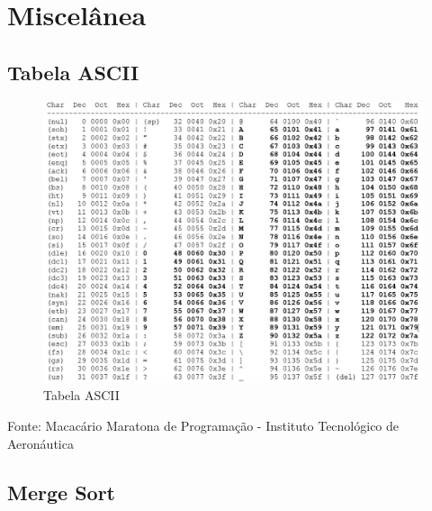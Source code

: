 \newpage
\section{Miscelânea}
\subsection{Tabela ASCII}

\begin{figure}[H]
    \caption{Tabela ASCII} 
    \vspace{0.5cm}
    \vspace{\belowcaptionskip}
    \centering
    \includegraphics[scale = 0.5]{image/ascii.jpg}
    \par\medskip
    \label{fig:ascii}
\end{figure}

\begin{center}
    Fonte: Macacário Maratona de Programação - Instituto Tecnológico de Aeronáutica
\end{center}


\subsection{Merge Sort}

\vspace{1cm}